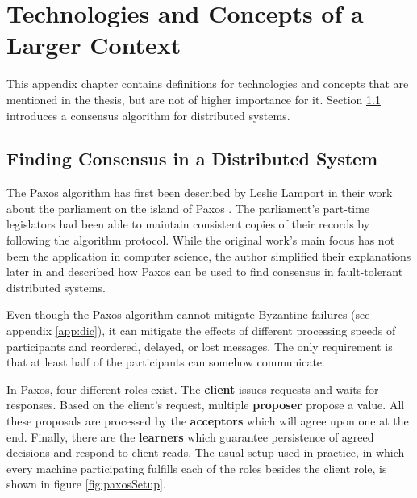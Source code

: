 
\cleardoublepage
\chapter{Technologies and Concepts of a Larger Context}

This appendix chapter contains definitions for technologies and concepts that are mentioned in the thesis, but are not of higher importance for it. Section \ref{sec:paxos} introduces a consensus algorithm for distributed systems.

\section{Finding Consensus in a Distributed System}
\label{sec:paxos}

The Paxos algorithm has first been described by Leslie Lamport in their work about the parliament on the island of Paxos \cite{paxos1998}.
The parliament's part-time legislators had been able to maintain consistent copies of their records by following the algorithm protocol.
While the original work's main focus has not been the application in computer science, the author simplified their explanations later in \cite{paxos2001} and described how Paxos can be used to find consensus in fault-tolerant distributed systems.

Even though the Paxos algorithm cannot mitigate Byzantine failures (see appendix \ref{app:dic}), it can mitigate the effects of different processing speeds of participants and reordered, delayed, or lost messages.
The only requirement is that at least half of the participants can somehow communicate.

In Paxos, four different roles exist. The \textbf{client} issues requests and waits for responses.
Based on the client's request, multiple \textbf{proposer} propose a value. All these proposals are processed by the \textbf{acceptors} which will agree upon one at the end.
Finally, there are the \textbf{learners} which guarantee persistence of agreed decisions and respond to client reads.
The usual setup used in practice, in which every machine participating fulfills each of the roles besides the client role, is shown in figure \ref{fig:paxosSetup}.

